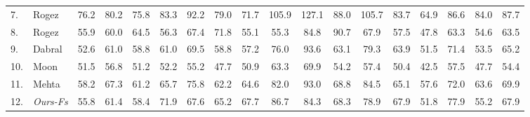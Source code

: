\documentclass[runningheads]{llncs}
\begin{document}
\begin{figure*}[t]
\begin{floatrow}
{{\begin{tabular}{l|l|ccccccccccccccc|c}
        7.&Rogez \cite{rogez2017lcr} &76.2&80.2&75.8&83.3&92.2&79.0&71.7&105.9
        &127.1&88.0&105.7&83.7&64.9&86.6&84.0&87.7\\
        8.&Rogez \cite{rogez2019lcr}&55.9& 60.0&64.5&56.3&67.4&71.8&55.1&55.3&84.8&90.7&67.9&57.5&47.8&63.3&54.6&63.5\\
        9.&Dabral \cite{Dabral2019MultiPerson3H}&52.6& 61.0&58.8&61.0&69.5&58.8&57.2&76.0&93.6&63.1&79.3&63.9&51.5&71.4&53.5&65.2\\
        10.&Moon\cite{moon2019camera}& 51.5&56.8&51.2&52.2&55.2&47.7&50.9&63.3&69.9&54.2&57.4&50.4&42.5&57.5&47.7&54.4 \\
        \hline
        11.&Mehta\cite{mehta2018single}&58.2&67.3&61.2&65.7&75.8&62.2&64.6&82.0
        &93.0&68.8&84.5&65.1&57.6&72.0&63.6&69.9\\
        \rowcolor{gray!14}
        12.& \textit{Ours-Fs}& 55.8&61.4&58.4&71.9&67.6&65.2&67.7&86.7&84.3&68.3&78.9&67.9&51.8&77.9&55.2 &67.9\\
        \hline
   \end{tabular} 
   \label{tab:human36}    
   }
    
   
    }
    {}
\end{floatrow}
\end{figure*}
\end{document}
